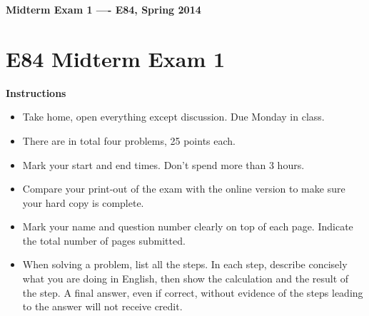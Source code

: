 \usepackage{html}

\begin{center}
{\Large \bf  Midterm Exam 1 ---- E84, Spring 2014}
\end{center}

\section*{E84 Midterm Exam 1}

{\bf Instructions}
\begin{itemize}
\item Take home, open everything except discussion. Due Monday in class.
\item There are in total four problems, 25 points each.
\item Mark your start and end times. Don't spend more than 3 hours.
\item Compare your print-out of the exam with the online version to make
	sure your hard copy is complete.
\item Mark your name and question number clearly on top of each page.
	Indicate the total number of pages submitted.
\item When solving a problem, list all the steps. In each step, describe 
	concisely what you are doing in English, then show the calculation 
	and the result of the step. A final answer, even if correct, without 
	evidence of the steps leading to the answer will not receive credit.
\end{itemize}

